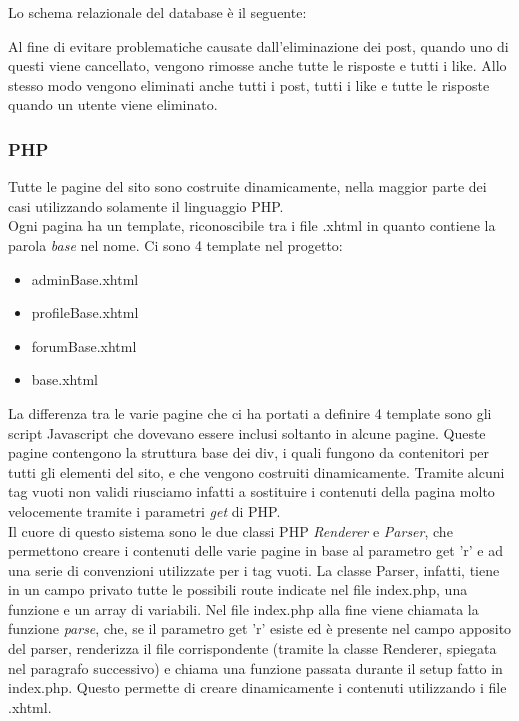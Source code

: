 Lo schema relazionale del database è il seguente: 


Al fine di evitare problematiche causate dall'eliminazione dei post, quando uno di questi viene cancellato, vengono rimosse anche tutte le risposte e tutti i like. Allo stesso modo vengono eliminati anche tutti i post, tutti i like e tutte le risposte quando un utente viene eliminato.

\subsubsection{PHP}\label{subs:php}

Tutte le pagine del sito sono costruite dinamicamente, nella maggior parte dei casi utilizzando solamente il linguaggio PHP.\\
Ogni pagina ha un template, riconoscibile tra i file .xhtml in quanto contiene la parola \textit{base} nel nome. Ci sono 4 template nel progetto:

\begin{itemize}
    
	\item adminBase.xhtml
    \item profileBase.xhtml
	\item forumBase.xhtml
	\item base.xhtml
	
\end{itemize}

La differenza tra le varie pagine che ci ha portati a definire 4 template sono gli script Javascript che dovevano essere inclusi soltanto in alcune pagine. Queste pagine contengono la struttura base dei div, i quali fungono da contenitori per tutti gli elementi del sito, e che vengono costruiti dinamicamente. Tramite alcuni tag vuoti non validi riusciamo infatti a sostituire i contenuti della pagina molto velocemente tramite i parametri \textit{get} di PHP.\\

Il cuore di questo sistema sono le due classi PHP \textit{Renderer} e \textit{Parser}, che permettono creare i contenuti delle varie pagine in base al parametro get 'r' e ad una serie di convenzioni utilizzate per i tag vuoti. La classe Parser, infatti,
tiene in un campo privato tutte le possibili route indicate nel file index.php, una funzione e un array di variabili. Nel file index.php alla fine viene chiamata la funzione \textit{parse}, che, se il parametro get 'r' esiste ed è presente nel campo apposito del parser, 
renderizza il file corrispondente (tramite la classe Renderer, spiegata nel paragrafo successivo) e chiama una funzione passata durante il setup fatto in index.php. Questo permette di creare dinamicamente i contenuti utilizzando i file .xhtml.

